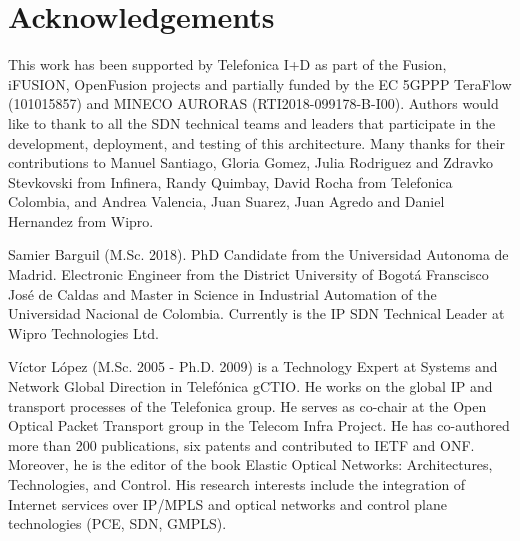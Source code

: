 \documentclass[10pt, conference]{IEEEtran}
\begin{document}
\section*{Acknowledgements}
This  work has been supported by Telefonica I+D as part of the Fusion, i\uppercase{FUSION}, OpenFusion projects and partially funded by the EC 5GPPP TeraFlow (101015857) and MINECO AURORAS (RTI2018-099178-B-I00). Authors would like to thank to all the SDN technical teams and leaders that participate in the development, deployment, and testing of this  architecture. Many thanks for their contributions to Manuel Santiago, Gloria Gomez, Julia Rodriguez and Zdravko Stevkovski from Infinera, Randy Quimbay, David Rocha from Telefonica Colombia, and Andrea Valencia, Juan Suarez, Juan Agredo and Daniel Hernandez from Wipro.   




\begin{IEEEbiography}
%
{Samier Barguil} (M.Sc. 2018). PhD Candidate from the Universidad Autonoma de Madrid. Electronic Engineer from the District University of Bogot\'a Franscisco José de Caldas and Master in Science in Industrial Automation of the Universidad Nacional de Colombia. Currently is the IP SDN Technical Leader at Wipro Technologies Ltd.\end{IEEEbiography}

\begin{IEEEbiography}%
{Víctor López} (M.Sc. 2005 - Ph.D. 2009) is a Technology Expert at Systems and Network Global Direction in Telefónica gCTIO. He works on the global IP and transport processes of the Telefonica group. He serves as co-chair at the Open Optical Packet Transport group in the Telecom Infra Project. He has co-authored more than 200 publications, six patents and contributed to IETF and ONF. Moreover, he is the editor of the book Elastic Optical Networks: Architectures, Technologies, and Control. His research interests include the integration of Internet services over IP/MPLS and optical networks and control plane technologies (PCE, SDN, GMPLS).\end{IEEEbiography}
\end{document}
